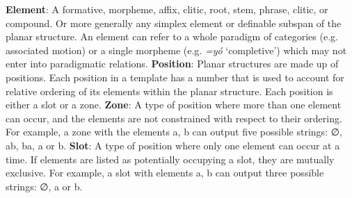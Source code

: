 \documentclass[output=paper]{langscibook}
\begin{document}
\ea \textbf{Element}: A formative, morpheme, affix, clitic, root, stem, phrase, clitic, or
compound. Or more generally any simplex element or definable subspan
of the planar structure. An element can refer to a whole paradigm of categories
(e.g. associated motion) or a single morpheme (e.g. \textit{=yó} ‘completive’)
which may not enter into paradigmatic relations.
\ex \textbf{Position}: Planar structures are made up of positions. Each position in a
template has a number that is used to account for relative ordering of its
elements within the planar structure. Each position is either a slot or a
zone.
\ex \textbf{Zone}: A type of position where more than one element can occur, and the
elements are not constrained with respect to their ordering. For example,
a zone with the elements {a, b} can output five possible strings: ∅, ab, ba,
a or b.
\ex \textbf{Slot}: A type of position where only one element can occur at a time. If elements
are listed as potentially occupying a slot, they are mutually exclusive.
For example, a slot with elements {a, b} can output three possible
strings: ∅, a or b.
\z
\z
\end{document}
